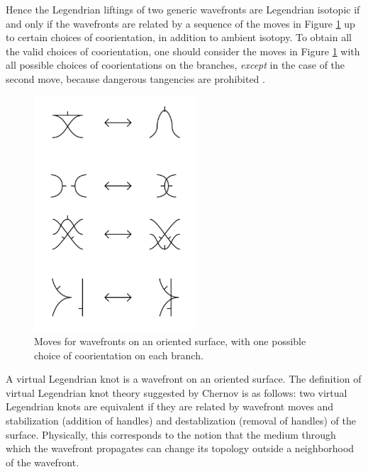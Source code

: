 Hence the Legendrian liftings of two generic wavefronts are Legendrian isotopic if and only if the wavefronts are related by a sequence of the moves in Figure \ref{wavefrontmoves.fig} up to certain choices of coorientation, in addition to ambient isotopy.  To obtain all the valid choices of coorientation, one should consider the moves in Figure \ref{wavefrontmoves.fig} with all possible choices of coorientations on the branches, {\it except} in the case of the second move, because dangerous tangencies are prohibited \cite{ArnoldInvariants}.


\begin{figure}[htbp]
	\includegraphics[width=6cm]{wavefrontmoves}
	\caption{Moves for wavefronts on an oriented surface, with one possible choice of coorientation on each branch.}
	\label{wavefrontmoves.fig}
\end{figure}

A virtual Legendrian knot is a wavefront on an oriented surface.  The definition of virtual Legendrian knot theory suggested by Chernov is as follows: two virtual Legendrian knots are equivalent if they are related by wavefront moves and stabilization (addition of handles) and destablization (removal of handles) of the surface. Physically, this corresponds to the notion that the medium through which the wavefront propagates can change its topology outside a neighborhood of the wavefront.


